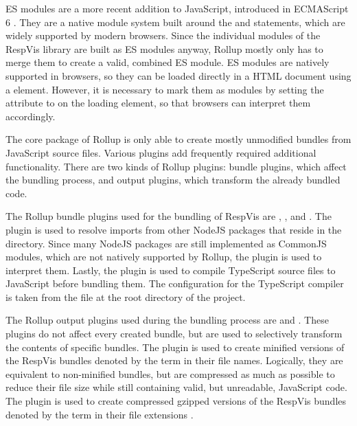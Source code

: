 ES modules are a more recent addition to JavaScript, introduced in
ECMAScript 6 \parencite{ECMAScript6}. They are a native module system
built around the  and  statements, which are
widely supported by modern browsers. Since the individual modules of
the RespVis library are built as ES modules anyway, Rollup mostly only
has to merge them to create a valid, combined ES module. ES modules
are natively supported in browsers, so they can be loaded directly in
a HTML document using a  element. However, it is
necessary to mark them as modules by setting the 
attribute to  on the loading  element,
so that browsers can interpret them accordingly.


The core package of Rollup is only able to create mostly unmodified
bundles from JavaScript source files. Various plugins add
frequently required additional functionality. There are two kinds of
Rollup plugins: bundle plugins, which affect the bundling process, and
output plugins, which transform the already bundled code.

The Rollup bundle plugins used for the bundling of RespVis are
, ,
and . The
 plugin is used to resolve imports
from other NodeJS packages that reside in the 
directory. Since many NodeJS packages are still implemented as
CommonJS modules, which are not natively supported by Rollup, the
 plugin is used to interpret them.
Lastly, the  plugin is used to compile
TypeScript source files to JavaScript before bundling them. The
configuration for the TypeScript compiler is taken from the
 file at the root directory of the project.

The Rollup output plugins used during the bundling process are
 and . These
plugins do not affect every created bundle, but are used to
selectively transform the contents of specific bundles. The
 plugin is used to create minified versions
of the RespVis bundles denoted by the term  in their file
names. Logically, they are equivalent to non-minified bundles, but are
compressed as much as possible to reduce their file size while still
containing valid, but unreadable, JavaScript code. The
 plugin is used to create compressed gzipped
versions of the RespVis bundles denoted by the term  in
their file extensions \parencite{GZIP}.

